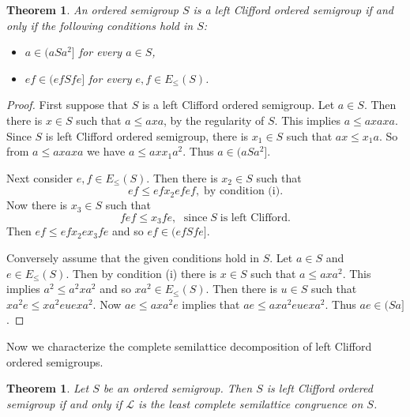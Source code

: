 \documentclass[13pt]{article}
\newtheorem{Theorem}[theorem]{Theorem}
\theoremstyle{definition}
\theoremstyle{remark}
\numberwithin{equation}{section}
\newcommand{\lc}{\mathcal{L}}
\begin{document}
\begin{Theorem}\label{cr34}
An ordered semigroup $S$ is a left Clifford ordered semigroup if and
only if the following conditions hold in $S$:
\begin{itemize}
\item  [(i)] $a \in (a S a^2]$  for every $a \in S$,
\item[(ii)]
$ef \in (ef S fe]$ for every $e, f \in E_\leq (S)$.
\end{itemize}
\end{Theorem}

\begin{proof}
First suppose that $S$ is a left Clifford ordered semigroup. Let $a
\in S$. Then there is $x \in S$ such that   $a \leq axa$, by the
regularity of $S$. This implies $a \leq axa xa $. Since $S$ is left
Clifford ordered semigroup,  there is $x_1 \in S$ such that $ax \leq
x_1a $. So from $a \leq ax a xa$ we have $a \leq ax x_1a^2$. Thus $a
\in (aSa^2]$.

Next consider $e, f \in E_\leq (S)$. Then there is $x_2  \in S$ such
that
$$ef \leq ef x_2 ef ef, \;\textrm{by condition (i)}.$$
Now  there is $x_3 \in S$ such that
$$fef \leq x_3 fe, \;\textrm{ since} \;S \;\textrm{is left Clifford}.$$
Then $ef \leq ef x_2 e x_3 fe$ and so $ef \in (ef S fe]$.

Conversely assume that the given conditions hold in $S$. Let $a \in
S$ and $e \in E_\leq(S)$. Then by condition (i) there is $x \in S$
such that $a \leq axa^2$. This implies $a^2 \leq a^2 xa^2$ and  so
$xa^2 \in E_\leq (S)$. Then  there is $u \in S$ such that $xa^2 e
\leq xa^2 e u e xa^2$. Now $ae  \leq axa^2e$ implies that $ae \leq
axa^2 eue xa^2$. Thus $ae \in (Sa]$.
\end{proof}
Now we characterize the complete semilattice decomposition of left
Clifford ordered semigroups.
\begin{Theorem}\label{cr32}
Let $S$ be an ordered semigroup. Then $S$ is left Clifford ordered
semigroup if and only if $\lc$ is the least complete semilattice
congruence on $S$.
\end{Theorem}
\end{document}
